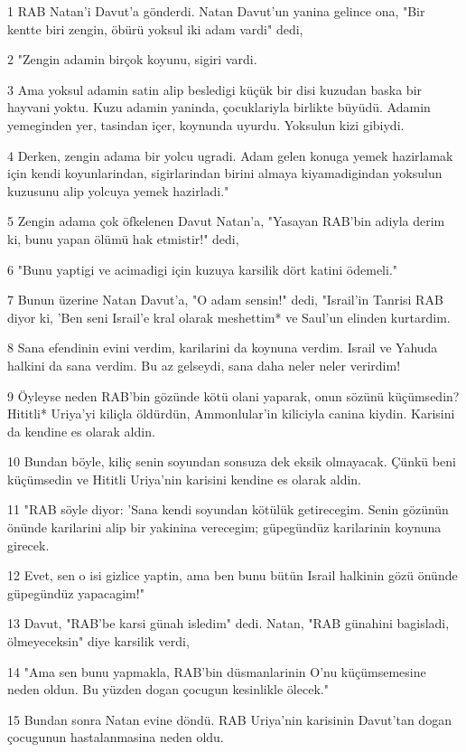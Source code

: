 \par 1 RAB Natan'i Davut'a gönderdi. Natan Davut'un yanina gelince ona, "Bir kentte biri zengin, öbürü yoksul iki adam vardi" dedi,
\par 2 "Zengin adamin birçok koyunu, sigiri vardi.
\par 3 Ama yoksul adamin satin alip besledigi küçük bir disi kuzudan baska bir hayvani yoktu. Kuzu adamin yaninda, çocuklariyla birlikte büyüdü. Adamin yemeginden yer, tasindan içer, koynunda uyurdu. Yoksulun kizi gibiydi.
\par 4 Derken, zengin adama bir yolcu ugradi. Adam gelen konuga yemek hazirlamak için kendi koyunlarindan, sigirlarindan birini almaya kiyamadigindan yoksulun kuzusunu alip yolcuya yemek hazirladi."
\par 5 Zengin adama çok öfkelenen Davut Natan'a, "Yasayan RAB'bin adiyla derim ki, bunu yapan ölümü hak etmistir!" dedi,
\par 6 "Bunu yaptigi ve acimadigi için kuzuya karsilik dört katini ödemeli."
\par 7 Bunun üzerine Natan Davut'a, "O adam sensin!" dedi, "Israil'in Tanrisi RAB diyor ki, 'Ben seni Israil'e kral olarak meshettim* ve Saul'un elinden kurtardim.
\par 8 Sana efendinin evini verdim, karilarini da koynuna verdim. Israil ve Yahuda halkini da sana verdim. Bu az gelseydi, sana daha neler neler verirdim!
\par 9 Öyleyse neden RAB'bin gözünde kötü olani yaparak, onun sözünü küçümsedin? Hititli* Uriya'yi kiliçla öldürdün, Ammonlular'in kiliciyla canina kiydin. Karisini da kendine es olarak aldin.
\par 10 Bundan böyle, kiliç senin soyundan sonsuza dek eksik olmayacak. Çünkü beni küçümsedin ve Hititli Uriya'nin karisini kendine es olarak aldin.
\par 11 "RAB söyle diyor: 'Sana kendi soyundan kötülük getirecegim. Senin gözünün önünde karilarini alip bir yakinina verecegim; güpegündüz karilarinin koynuna girecek.
\par 12 Evet, sen o isi gizlice yaptin, ama ben bunu bütün Israil halkinin gözü önünde güpegündüz yapacagim!"
\par 13 Davut, "RAB'be karsi günah isledim" dedi. Natan, "RAB günahini bagisladi, ölmeyeceksin" diye karsilik verdi,
\par 14 "Ama sen bunu yapmakla, RAB'bin düsmanlarinin O'nu küçümsemesine neden oldun. Bu yüzden dogan çocugun kesinlikle ölecek."
\par 15 Bundan sonra Natan evine döndü. RAB Uriya'nin karisinin Davut'tan dogan çocugunun hastalanmasina neden oldu.
